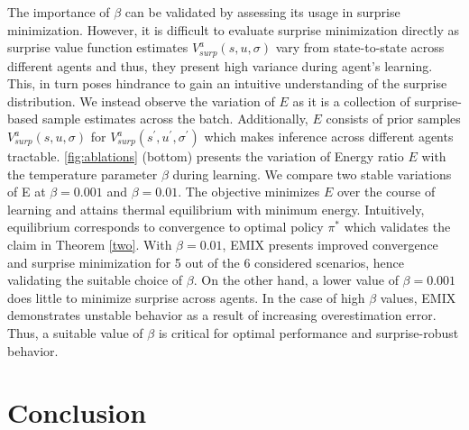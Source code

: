 \documentclass{article}
\begin{document}
\begin{multicols}{2}
The importance of $\beta$ can be validated by assessing its usage in surprise minimization. However, it is difficult to evaluate surprise minimization directly as surprise value function estimates $V_{surp}^{a}(s,u,\sigma)$ vary from state-to-state across different agents and thus, they present high variance during agent's learning. This, in turn poses hindrance to gain an intuitive understanding of the surprise distribution. We instead observe the variation of $E$ as it is a collection of surprise-based sample estimates across the batch. Additionally, $E$ consists of prior samples $V_{surp}^{a}(s,u,\sigma)$ for $V_{surp}^{a}(s^{'},u^{'},\sigma^{'})$ which makes inference across different agents tractable. \autoref{fig:ablations} (bottom) presents the variation of Energy ratio $E$ with the temperature parameter $\beta$ during learning. We compare two stable variations of E at $\beta=0.001$ and $\beta=0.01$. The objective minimizes $E$ over the course of learning and attains thermal equilibrium with minimum energy. Intuitively, equilibrium corresponds to convergence to optimal policy $\pi^{*}$ which validates the claim in Theorem \autoref{two}. With $\beta=0.01$, EMIX presents improved convergence and surprise minimization for 5 out of the 6 considered scenarios, hence validating the suitable choice of $\beta$. On the other hand, a lower value of $\beta=0.001$ does little to minimize surprise across agents. In the case of high $\beta$ values, EMIX demonstrates unstable behavior as a result of increasing overestimation error. Thus, a suitable value of $\beta$ is critical for optimal performance and surprise-robust behavior. 

\section{Conclusion}


 
\footnotesize{}
\end{multicols}

\end{document}
